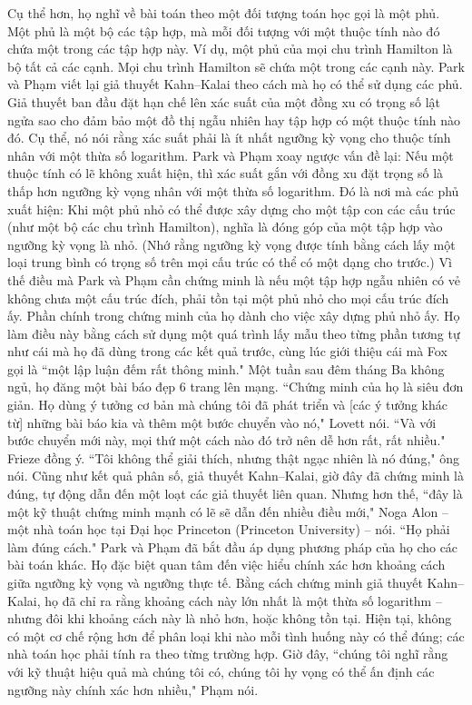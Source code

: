 \begin{multicols}{2}
\begin{figure}[H]
		\vspace*{-10pt}
	\end{figure}
	Cụ thể hơn, họ nghĩ về bài toán theo một đối tượng toán học gọi là một phủ. Một phủ là một bộ các tập hợp, mà mỗi đối tượng với một thuộc tính nào đó chứa một trong các tập hợp này. Ví dụ, một phủ của mọi chu trình Hamilton là bộ tất cả các cạnh. Mọi chu trình Hamilton sẽ chứa một trong các cạnh này.
	\vskip 0.1cm
	Park và Phạm viết lại giả thuyết Kahn--Kalai theo cách mà họ có thể sử dụng các phủ. Giả thuyết ban đầu đặt hạn chế lên xác suất của một đồng xu có trọng số lật ngửa sao cho đảm bảo một đồ thị ngẫu nhiên hay tập hợp có một thuộc tính nào đó. Cụ thể, nó nói rằng xác suất phải là ít nhất ngưỡng kỳ vọng cho thuộc tính nhân với một thừa số logarithm. Park và Phạm xoay ngược vấn đề lại: Nếu một thuộc tính có lẽ không xuất hiện, thì xác suất gắn với đồng xu đặt trọng số là thấp hơn ngưỡng kỳ vọng nhân với một thừa số logarithm.
	\vskip 0.1cm
	Đó là nơi mà các phủ xuất hiện: Khi một phủ nhỏ có thể được xây dựng cho một tập con các cấu trúc (như một bộ các chu trình Hamilton), nghĩa là đóng góp của một tập hợp vào ngưỡng kỳ vọng là nhỏ. (Nhớ rằng ngưỡng kỳ vọng được tính bằng cách lấy một loại trung bình có trọng số trên mọi cấu trúc có thể có một dạng cho trước.) Vì thế điều mà Park và Phạm cần chứng minh là nếu một tập hợp ngẫu nhiên có vẻ không chưa một cấu trúc đích, phải tồn tại một phủ nhỏ cho mọi cấu trúc đích ấy. Phần chính trong chứng minh của họ dành cho việc xây dựng phủ nhỏ ấy.
	\vskip 0.1cm
	Họ làm điều này bằng cách sử dụng một quá trình lấy mẫu theo từng phần tương tự như cái mà họ đã dùng trong các kết quả trước, cùng lúc giới thiệu cái mà Fox gọi là ``một lập luận đếm rất thông minh." Một tuần sau đêm tháng Ba không ngủ, họ đăng một bài báo đẹp $6$ trang lên mạng.
	\vskip 0.1cm
	``Chứng minh của họ là siêu đơn giản. Họ dùng ý tưởng cơ bản mà chúng tôi đã phát triển và [các ý tưởng khác từ] những bài báo kia và thêm một bước chuyển vào nó," Lovett nói. ``Và với bước chuyển mới này, mọi thứ một cách nào đó trở nên dễ hơn rất, rất nhiều."
	\vskip 0.1cm
	Frieze đồng ý. ``Tôi không thể giải thích, nhưng thật ngạc nhiên là nó đúng," ông nói.
	\vskip 0.1cm
	Cũng như kết quả phân số, giả thuyết Kahn--Kalai, giờ đây đã chứng minh là đúng, tự động dẫn đến một loạt các giả thuyết liên quan. Nhưng hơn thế, ``đây là một kỹ thuật chứng minh mạnh có lẽ sẽ dẫn đến nhiều điều mới,"  Noga Alon -- một nhà toán học tại Đại học Princeton (Princeton University) -- nói. ``Họ phải làm đúng cách."
	\vskip 0.1cm
	Park và Phạm đã bắt đầu áp dụng phương pháp của họ cho các bài toán khác. Họ đặc biệt quan tâm đến việc hiểu chính xác hơn khoảng cách giữa ngưỡng kỳ vọng và ngưỡng thực tế. Bằng cách chứng minh giả thuyết Kahn--Kalai, họ đã chỉ ra  rằng khoảng cách này lớn nhất là một thừa số logarithm -- nhưng đôi khi khoảng cách này là nhỏ hơn, hoặc không tồn tại. Hiện tại, không có một cơ chế rộng hơn để phân loại khi nào mỗi tình huống này có thể đúng; các nhà toán học phải tính ra theo từng trường hợp. Giờ đây, ``chúng tôi nghĩ rằng với kỹ thuật hiệu quả mà chúng tôi có, chúng tôi hy vọng có thể ấn định các ngưỡng này chính xác hơn nhiều," Phạm nói.

\end{multicols}
